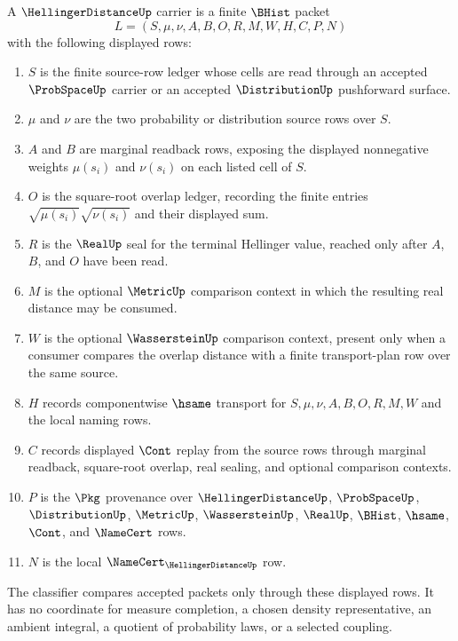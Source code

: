 \begin{definition}
\label{def:hellinger-distance-carrier}
A $\HellingerDistanceUp$ carrier is a finite $\BHist$ packet
$$
L=(S,\mu,\nu,A,B,O,R,M,W,H,C,P,N)
$$
with the following displayed rows:
\begin{enumerate}
\item $S$ is the finite source-row ledger whose cells are read through an accepted $\ProbSpaceUp$ carrier or an accepted $\DistributionUp$ pushforward surface.
\item $\mu$ and $\nu$ are the two probability or distribution source rows over $S$.
\item $A$ and $B$ are marginal readback rows, exposing the displayed nonnegative weights $\mu(s_i)$ and $\nu(s_i)$ on each listed cell of $S$.
\item $O$ is the square-root overlap ledger, recording the finite entries $\sqrt{\mu(s_i)}\sqrt{\nu(s_i)}$ and their displayed sum.
\item $R$ is the $\RealUp$ seal for the terminal Hellinger value, reached only after $A$, $B$, and $O$ have been read.
\item $M$ is the optional $\MetricUp$ comparison context in which the resulting real distance may be consumed.
\item $W$ is the optional $\WassersteinUp$ comparison context, present only when a consumer compares the overlap distance with a finite transport-plan row over the same source.
\item $H$ records componentwise $\hsame$ transport for $S,\mu,\nu,A,B,O,R,M,W$ and the local naming rows.
\item $C$ records displayed $\Cont$ replay from the source rows through marginal readback, square-root overlap, real sealing, and optional comparison contexts.
\item $P$ is the $\Pkg$ provenance over $\HellingerDistanceUp$, $\ProbSpaceUp$, $\DistributionUp$, $\MetricUp$, $\WassersteinUp$, $\RealUp$, $\BHist$, $\hsame$, $\Cont$, and $\NameCert$ rows.
\item $N$ is the local $\NameCert_{\HellingerDistanceUp}$ row.
\end{enumerate}
The classifier compares accepted packets only through these displayed rows. It has no coordinate for measure completion, a chosen density representative, an ambient integral, a quotient of probability laws, or a selected coupling.
\end{definition}

